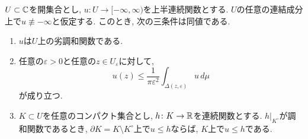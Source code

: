 \begin{tcolorbox}[mybox]
\begin{thm}
$U \subset \mathbb{C}$を開集合とし,
$u \colon U \to [-\infty,\infty)$を上半連続関数とする.
$U$の任意の連結成分上で$u \not\equiv -\infty$と仮定する.
このとき, 次の三条件は同値である.

\begin{enumerate}[label=(\roman*)]
\item
$u$は$U$上の劣調和関数である.

\item
任意の$\varepsilon > 0$と任意の$z \in U_\varepsilon$に対して,
\[
u(z)
\leq
\frac{1}{\pi\varepsilon^2}
\int_{\Delta(z,\varepsilon)} u\,d\mu
\]
が成り立つ.

\item
$K \subset U$を任意のコンパクト集合とし,
$h \colon K \to \mathbb{R}$を連続関数とする.
$h|_{K^\circ}$が調和関数であるとき,
$\partial K=K\setminus K^\circ$上で$u \leq h$ならば,
$K$上で$u \leq h$である.
\end{enumerate}
\end{thm}
\end{tcolorbox}


